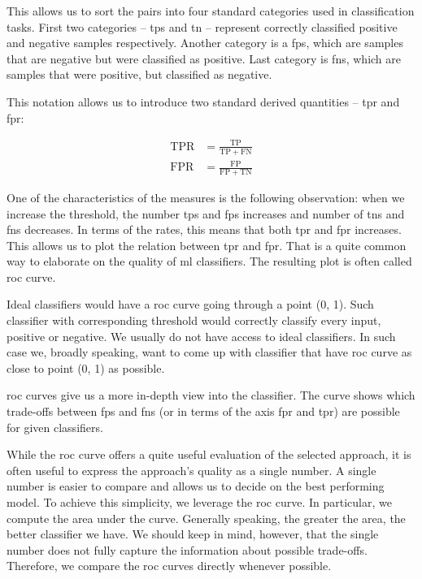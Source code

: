 This allows us to sort the pairs into four standard categories used in classification tasks. First two categories -- \glspl{tp} and \gls{tn} -- represent correctly classified positive and negative samples respectively. Another category is a \glspl{fp}, which are samples that are negative but were classified as positive. Last category is \glspl{fn}, which are samples that were positive, but classified as negative.

This notation allows us to introduce two standard derived quantities -- \gls{tpr} and \gls{fpr}:

\begin{align*}
    \mathrm{TPR} &= \frac{\mathrm{TP}}{\mathrm{TP} + \mathrm{FN}} \\[8pt]
    \mathrm{FPR} &= \frac{\mathrm{FP}}{\mathrm{FP} + \mathrm{TN}}
\end{align*}

One of the characteristics of the measures is the following observation:
when we increase the threshold, the number \glspl{tp} and \glspl{fp} increases and  number of \glspl{tn} and \glspl{fn} decreases. In terms of the rates, this means that both \gls{tpr} and \gls{fpr} increases. This allows us to plot the relation between \gls{tpr} and \gls{fpr}. That is a quite common way to elaborate on the quality of \gls{ml} classifiers. The resulting plot is often called \gls{roc} curve.

Ideal classifiers would have a \gls{roc} curve going through a point
(0, 1). Such classifier with corresponding threshold would correctly
classify every input, positive or negative. We usually do not
have access to ideal classifiers. In such case we, broadly speaking,
want to come up with classifier that have \gls{roc} curve as close to
point (0, 1) as possible.

\gls{roc} curves give us a more in-depth view into the classifier.
The curve shows which trade-offs between \glspl{fp} and \glspl{fn} (or in terms
of the axis \gls{fpr} and \gls{tpr}) are possible for given classifiers.

While the \gls{roc} curve offers a quite useful evaluation of the selected approach, it is often useful to express the approach's quality as a single number. A single number is easier to compare and allows us to decide on the best performing model. To achieve this simplicity, we leverage the \gls{roc} curve. In particular, we compute the area under the curve. Generally speaking, the greater the area, the better classifier we have. We should keep in mind, however, that the single number does not fully capture the information about possible trade-offs. Therefore, we compare the \gls{roc} curves directly whenever possible.

